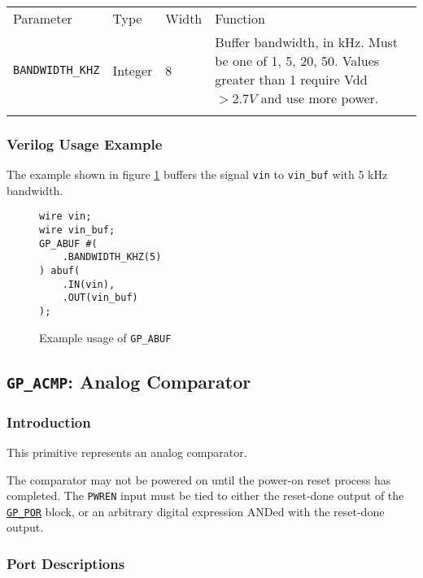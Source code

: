 \documentclass[11pt]{article}
\newcommand{\tokenstyle}[1]{\texttt{#1}}
\newcommand{\wirestyle}[1]{\texttt{#1}}
\newcommand{\whenstyle}[1]{{\fontseries{sb}\selectfont#1}}
\newcommand{\tokenref}[2]{\hyperref[#2]{\tokenstyle{#1}}}
\newcommand{\thinhline}{\Xhline{1\arrayrulewidth}}
\newcommand{\thickhline}{\Xhline{2.5\arrayrulewidth}}
\begin{document}
\begin{tabularx}{\textwidth}{lllX}
\thinhline
\whenstyle{Parameter} & \whenstyle{Type} & \whenstyle{Width} & \whenstyle{Function} \\
\thickhline
\tokenstyle{BANDWIDTH\_KHZ} & Integer & 8 & Buffer bandwidth, in kHz. \newline
Must be one of 1, 5, 20, 50.\newline
Values greater than 1 require Vdd $> 2.7V$ and use more power. \\
\thinhline
\end{tabularx}

\subsubsection{Verilog Usage Example}

The example shown in figure \ref{gp-abuf-example} buffers the signal \wirestyle{vin} to \wirestyle{vin\_buf} with 5 kHz
bandwidth.

\begin{figure}[h]
\begin{lstlisting}
wire vin;
wire vin_buf;
GP_ABUF #(
	.BANDWIDTH_KHZ(5)
) abuf(
	.IN(vin),
	.OUT(vin_buf)
);
\end{lstlisting}
\caption{Example usage of \tokenstyle{GP\_ABUF}}
\label{gp-abuf-example}
\end{figure}


\pagebreak
\subsection{\tokenstyle{GP\_ACMP}: Analog Comparator}
\label{gp-acmp}

\subsubsection{Introduction}
This primitive represents an analog comparator.

The comparator may not be powered on until the power-on reset process has completed. The \tokenstyle{PWREN} input must be tied to
either the reset-done output of the \tokenref{GP\_POR}{gp-por} block, or an arbitrary digital expression ANDed with the reset-done output.

\subsubsection{Port Descriptions}
\end{document}
